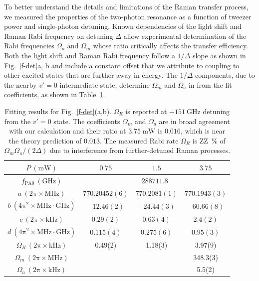 \documentclass[aps,prl,twocolumn,10pt,superscriptaddress]{revtex4-1}
\begin{document}
To better understand the details and limitations of the Raman transfer process, we measured the properties of the two-photon resonance as a function of tweezer power and single-photon detuning.
Known dependencies of the light shift and Raman Rabi frequency on detuning $\Delta$ allow experimental determination of the Rabi frequencies
$ \Omega_a $ and $\Omega_m$ whose ratio critically affects the transfer efficiency.
Both the light shift and Raman Rabi frequency follow a $1/\Delta$ slope as shown in Fig.~\ref{f-det}a, b and include a constant offset that we attribute to coupling to other excited states that are further away in energy.
The $1/\Delta$ components, due to the nearby $v'=0$ intermediate state, determine $\Omega_m $ and $ \Omega_a $ in from the fit coefficients, as shown in Table~\ref{tab:f-det:fit}.

\begin{table}[ht]
  \centering
  \begin{tabular}{|c|c|c|c|}
    $P~(\mathrm{mW})$&$0.75$&$1.5$&$3.75$\\\hline
    $f_{\mathrm{PA}0}~(\mathrm{GHz})$&\multicolumn{3}{|c|}{$288711.8$}\\\hline
    $a~(\mathrm{2\pi\times MHz})$&$770.20452(6)$&$770.2081(1)$&$770.1943(3)$\\
    $b~(\mathrm{4\pi^2\times MHz\cdot GHz})$&$-12.46(2)$&$-24.44(3)$&$-60.66(8)$\\\hline
    $c~(\mathrm{2\pi\times kHz})$&$0.29(2)$&$0.63(4)$&$2.4(2)$\\
    $d~(\mathrm{4\pi^2\times MHz\cdot GHz})$&$0.115(4)$&$0.275(6)$&$0.95(3)$\\ \hline
    $\Omega_R~(\mathrm{2\pi\times kHz})$ & 0.49(2) & 1.18(3) & 3.97(9) \\
    $\Omega_m~(\mathrm{2\pi\times MHz})$ & & & 348.3(3) \\
    $\Omega_a~(\mathrm{2\pi\times kHz})$ & & & 5.5(2)
  \end{tabular}
  \caption{Fitting results for Fig.~\ref{f-det}(a,b). $\Omega_R$ is reported at $-151~\mathrm{GHz}$ detuning from the $v' = 0$ state.  The coefficients $\Omega_m$ and $\Omega_a$ are in broad agreement with our calculation and their ratio at $3.75~\mathrm{mW}$ is $0.016$, which is near the theory prediction of $0.013$.  The measured Rabi rate $\Omega_R$ is ZZ~\% of $\Omega_m \Omega_a/(2\Delta)$ due to interference from further-detuned Raman processes.
    \label{tab:f-det:fit}}
\end{table}
\end{document}
